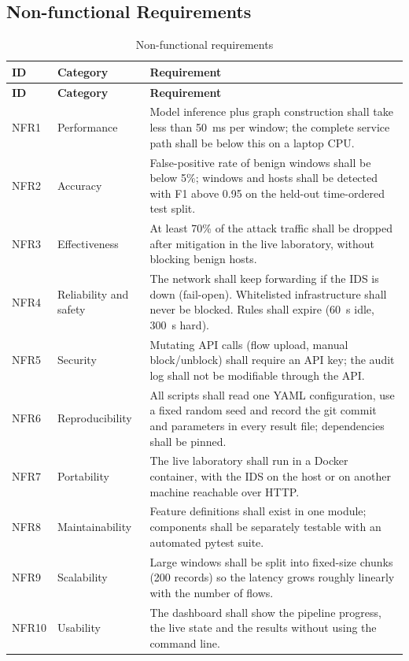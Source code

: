 \subsection{Non-functional Requirements}

\begin{longtable}{|p{1.3cm}|p{3cm}|p{9.5cm}|}
\caption{Non-functional requirements}\label{tab:nfr}\\
\hline
\textbf{ID} & \textbf{Category} & \textbf{Requirement} \\ \hline
\endfirsthead
\hline \textbf{ID} & \textbf{Category} & \textbf{Requirement} \\ \hline
\endhead
NFR1 & Performance & Model inference plus graph construction shall take less than 50~ms per window; the complete service path shall be below this on a laptop CPU. \\ \hline
NFR2 & Accuracy & False-positive rate of benign windows shall be below 5\%; windows and hosts shall be detected with F1 above 0.95 on the held-out time-ordered test split. \\ \hline
NFR3 & Effectiveness & At least 70\% of the attack traffic shall be dropped after mitigation in the live laboratory, without blocking benign hosts. \\ \hline
NFR4 & Reliability and safety & The network shall keep forwarding if the IDS is down (fail-open). Whitelisted infrastructure shall never be blocked. Rules shall expire (60~s idle, 300~s hard). \\ \hline
NFR5 & Security & Mutating API calls (flow upload, manual block/unblock) shall require an API key; the audit log shall not be modifiable through the API. \\ \hline
NFR6 & Reproducibility & All scripts shall read one YAML configuration, use a fixed random seed and record the git commit and parameters in every result file; dependencies shall be pinned. \\ \hline
NFR7 & Portability & The live laboratory shall run in a Docker container, with the IDS on the host or on another machine reachable over HTTP. \\ \hline
NFR8 & Maintainability & Feature definitions shall exist in one module; components shall be separately testable with an automated pytest suite. \\ \hline
NFR9 & Scalability & Large windows shall be split into fixed-size chunks (200 records) so the latency grows roughly linearly with the number of flows. \\ \hline
NFR10 & Usability & The dashboard shall show the pipeline progress, the live state and the results without using the command line. \\ \hline
\end{longtable}


